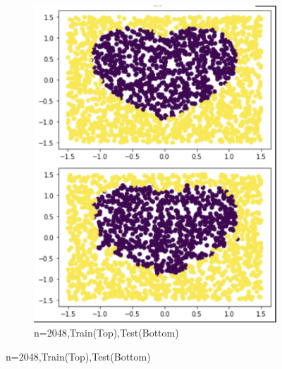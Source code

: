 \documentclass[a4paper]{article}
\theoremstyle{definition}
\newenvironment{soln}{
    \leavevmode\color{blue}\ignorespaces
}{}
\begin{document}
\begin{enumerate}
\begin{soln}
\begin{figure}[H]
\begin{subfigure}{0.5\textwidth}
            \includegraphics[scale=0.5]{2048.png}
            \caption{n=2048,Train(Top),Test(Bottom)}
            \label{fig:q2}
        \end{subfigure}
        \end{figure} 
        \begin{figure}[H]
            \centering

\end{figure}
\end{soln}
\end{enumerate}
\end{document}
